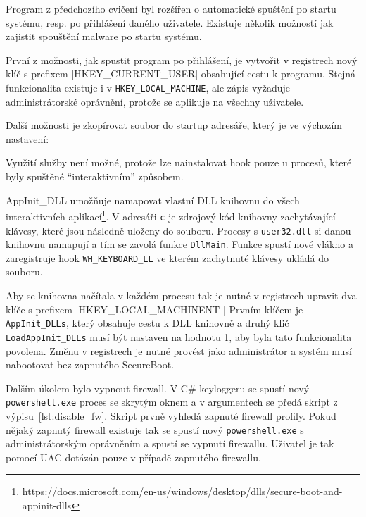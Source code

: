 \documentclass[12pt,a4paper]{article}
\newcommand{\Csh}{C\#}
\begin{document}



Program z předchozího cvičení byl rozšířen o automatické spuštění po startu systému, resp. po přihlášení daného uživatele.
Existuje několik možností jak zajistit spouštění malware po startu systému.

První z možnosti, jak spustit program po přihlášení, je vytvořit v registrech nový klíč s prefixem |HKEY_CURRENT_USER\Software\Microsoft\Windows\CurrentVersion\Run| obsahující cestu k programu.
Stejná funkcionalita existuje i v \texttt{HKEY\_LOCAL\_MACHINE}, ale zápis vyžaduje administrátorské oprávnění, protože se aplikuje na všechny uživatele.

Další možnosti je zkopírovat soubor do startup adresáře, který je ve výchozím nastavení:
|%

Využití služby není možné, protože lze nainstalovat hook pouze u procesů, které byly spuštěné ``interaktivním'' způsobem.

AppInit\_DLL umožňuje namapovat vlastní DLL knihovnu do všech interaktivních aplikací\footnote{https://docs.microsoft.com/en-us/windows/desktop/dlls/secure-boot-and-appinit-dlls}.
V adresáři \texttt{c} je zdrojový kód knihovny zachytávající klávesy, které jsou následně uloženy do souboru.
Procesy s \texttt{user32.dll} si danou knihovnu namapují a tím se zavolá funkce \texttt{DllMain}.
Funkce spustí nové vlákno a zaregistruje hook \texttt{WH\_KEYBOARD\_LL} ve kterém zachytnuté klávesy ukládá do souboru.

Aby se knihovna načítala v každém procesu tak je nutné v registrech upravit dva klíče s prefixem 
|HKEY_LOCAL_MACHINE\SOFTWARE\Microsoft\Windows NT \CurrentVersion\Windows|
Prvním klíčem je \texttt{AppInit\_DLLs}, který obsahuje cestu k DLL knihovně a druhý klič \texttt{LoadAppInit\_DLLs} musí být nastaven na hodnotu 1, aby byla tato funkcionalita povolena.
Změnu v registrech je nutné provést jako administrátor a systém musí nabootovat bez zapnutého SecureBoot.


Dalším úkolem bylo vypnout firewall.
V \Csh{} keyloggeru se spustí nový \texttt{powershell.exe} proces se skrytým oknem a v argumentech se předá skript z výpisu~\ref{lst:disable_fw}.
Skript prvně vyhledá zapnuté firewall profily.
Pokud nějaký zapnutý firewall existuje tak se spustí nový \texttt{powershell.exe} s administrátorským oprávněním a spustí se vypnutí firewallu.
Uživatel je tak pomocí UAC dotázán pouze v případě zapnutého firewallu.
\end{document}
